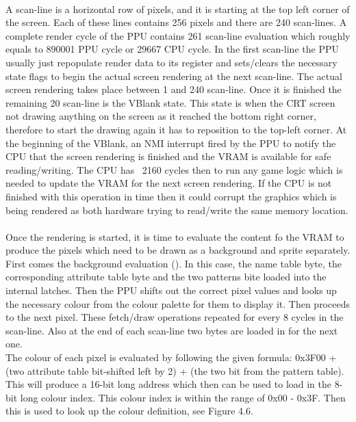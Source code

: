 \documentclass[]{report}
\begin{document}
\paragraph{ }
A scan-line is a horizontal row of pixels, and it is starting at the top left corner of the screen. Each of these lines contains 256 pixels and there are 240 scan-lines. A complete render cycle of the PPU contains 261 scan-line evaluation which roughly equals to 890001 PPU cycle or 29667 CPU cycle.
In the first scan-line the PPU usually just repopulate render data to its register and sets/clears the necessary state flags to begin the actual screen rendering at the next scan-line.
The actual screen rendering takes place between 1 and 240 scan-line. Once it is finished the remaining 20 scan-line is the VBlank state. This state is when the CRT screen not drawing anything on the screen as it reached the bottom right corner, therefore to start the drawing again it has to reposition to the top-left corner. At the beginning of the VBlank, an NMI interrupt fired by the PPU to notify the CPU that the screen rendering is finished and the VRAM is available for safe reading/writing.
The CPU has ~2160 cycles then to run any game logic which is needed to update the VRAM for the next screen rendering. If the CPU is not finished with this operation in time then it could corrupt the graphics which is being rendered as both hardware trying to read/write the same memory location.

\paragraph{ }
Once the rendering is started, it is time to evaluate the content fo the VRAM to produce the pixels which need to be drawn as a background and sprite separately. First comes the background evaluation (\cite{BGEV}). In this case, the name table byte, the corresponding attribute table byte and the two patterns bite loaded into the internal latches. Then the PPU shifts out the correct pixel values and looks up the necessary colour from the colour palette for them to display it. Then proceeds to the next pixel. These fetch/draw operations repeated for every 8 cycles in the scan-line. Also at the end of each scan-line two bytes are loaded in for the next one.
\\
The colour of each pixel is evaluated by following the given formula: 0x3F00 + (two attribute table bit-shifted left by 2) + (the two bit from the pattern table). This will produce a 16-bit long address which then can be used to load in the 8-bit long colour index. This colour index is within the range of 0x00 - 0x3F. Then this is used to look up the colour definition, see Figure 4.6.
\end{document}
